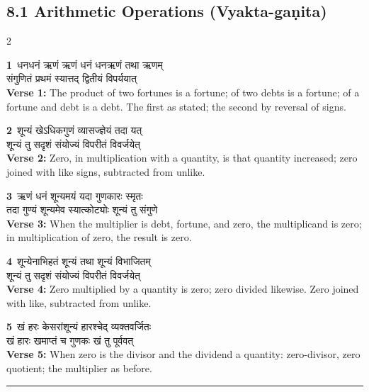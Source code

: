 \documentclass[11pt,a4paper]{article}
\newcommand{\dev}[1]{{\devanagarifont #1}}
\newcommand{\vnum}[1]{\textcolor{versenumbercolor}{\textbf{#1}}}
\begin{document}
\vspace{0.5em}

\subsection*{8.1 Arithmetic Operations (Vyakta-ga\d nita)}
\label{sec:8.1}

\begin{paracol}{2}

\switchcolumn[0]
\vnum{1}\ \dev{धनधनं ऋणं ऋणं धनं धनऋणं तथा ऋणम्}\\
\dev{संगुणितं प्रथमं स्यात्तद् द्वितीयं विपर्ययात्}\\
\switchcolumn[1]
\textbf{Verse 1:} The product of two fortunes is a fortune; of two debts is a fortune; of a fortune and debt is a debt. The first as stated; the second by reversal of signs.

\switchcolumn[0]
\vnum{2}\ \dev{शून्यं खेऽधिकगुणं व्यासज्ज्ञेयं तदा यत्}\\
\dev{शून्यं तु सदृशं संयोज्यं विपरीतं विवर्जयेत्}\\
\switchcolumn[1]
\textbf{Verse 2:} Zero, in multiplication with a quantity, is that quantity increased; zero joined with like signs, subtracted from unlike.

\switchcolumn[0]
\vnum{3}\ \dev{ऋणं धनं शून्यमयं यदा गुणकारः स्मृतः}\\
\dev{तदा गुण्यं शून्यमेव स्यात्कोट्योः शून्यं तु संगुणे}\\
\switchcolumn[1]
\textbf{Verse 3:} When the multiplier is debt, fortune, and zero, the multiplicand is zero; in multiplication of zero, the result is zero.

\switchcolumn[0]
\vnum{4}\ \dev{शून्येनाभिहतं शून्यं तथा शून्यं विभाजितम्}\\
\dev{शून्यं तु सदृशं संयोज्यं विपरीतं विवर्जयेत्}\\
\switchcolumn[1]
\textbf{Verse 4:} Zero multiplied by a quantity is zero; zero divided likewise. Zero joined with like, subtracted from unlike.

\switchcolumn[0]
\vnum{5}\ \dev{खं हरः केसरांशून्यं हारश्चेद् व्यक्तवर्जितः}\\
\dev{खं हारः खमाप्तं च गुणकः खं तु पूर्ववत्}\\
\switchcolumn[1]
\textbf{Verse 5:} When zero is the divisor and the dividend a quantity: zero-divisor, zero quotient; the multiplier as before.

\end{paracol}

\vspace{0.5em}
\noindent\rule{\textwidth}{0.6pt}
\vspace{0.3em}
\end{document}
